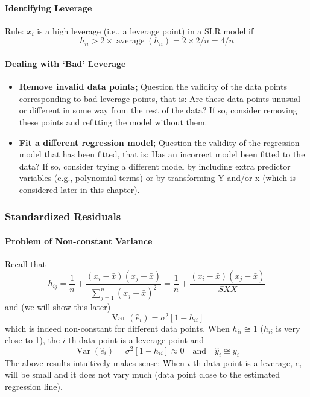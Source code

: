 \documentclass[10pt]{article}
\begin{document}
\paragraph{Identifying Leverage} Rule: $x_i$ is a high leverage (i.e., a leverage point) in a SLR model if 
\begin{equation*}
    h_{i i}>2 \times \operatorname{average}\left(h_{i i}\right)=2 \times 2 / n=4 / n
\end{equation*}

\paragraph{Dealing with `Bad' Leverage}
\begin{itemize}
    \item \textbf{Remove invalid data points;} Question the validity of the data points corresponding to bad leverage points, that is: Are these data points unusual or different in some way from the rest of the data? If so, consider removing these points and refitting the model without them. 
    \item \textbf{Fit a different regression model;} Question the validity of the regression model that has been fitted, that is: Has an incorrect model been fitted to the data? If so, consider trying a different model by including extra predictor variables (e.g., polynomial terms) or by transforming Y and/or x (which is considered later in this chapter).
\end{itemize}

\subsubsection{Standardized Residuals}
\paragraph{Problem of Non-constant Variance} Recall that 
\begin{equation*}
    h_{i j}=\frac{1}{n}+\frac{\left(x_{i}-\bar{x}\right)\left(x_{j}-\bar{x}\right)}{\sum_{j=1}^{n}\left(x_{j}-\bar{x}\right)^{2}}=\frac{1}{n}+\frac{\left(x_{i}-\bar{x}\right)\left(x_{j}-\bar{x}\right)}{S X X}
\end{equation*}
and (we will show this later)
\begin{equation*}
    \operatorname{Var}\left(\hat{e}_{i}\right)=\sigma^{2}\left[1-h_{i i}\right]
\end{equation*}
which is indeed non-constant for different data points. When  $h_{ii} \cong 1$ ($h_{ii}$ is very close to 1), the $i$-th data point is a leverage point and 
\begin{equation*}
    \operatorname{Var}(\hat{e}_i) = \sigma^{2}\left[1-h_{i i}\right] \approx 0 \quad \text{and} \quad \hat{y}_{i} \cong y_{i}
\end{equation*}
The above results intuitively makes sense: When $i$-th data point is a leverage, $\hat{e}_i$ will be small and it does not vary much (data point close to the estimated regression line). 
\end{document}
